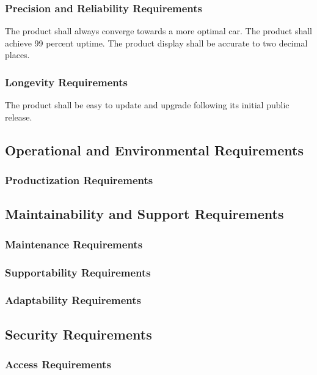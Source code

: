 \documentclass[12pt, titlepage]{article}
\begin{document}
\subsubsection{Precision and Reliability Requirements}

The product shall always converge towards a more optimal car. The product shall 
achieve 99 percent uptime. The product display shall be accurate to two decimal 
places.

\subsubsection{Longevity Requirements}

The product shall be easy to update and upgrade following its initial public 
release. 

\subsection{Operational and Environmental Requirements}

\subsubsection{Productization Requirements}

\subsection{Maintainability and Support Requirements}

\subsubsection{Maintenance Requirements}

\subsubsection{Supportability Requirements}

\subsubsection{Adaptability Requirements}

\subsection{Security Requirements}

\subsubsection{Access Requirements}
\end{document}
